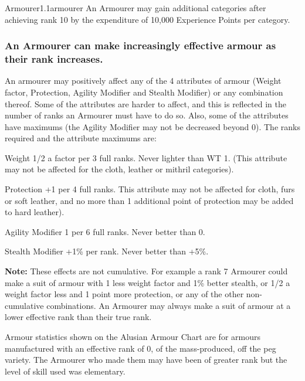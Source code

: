 \begin{skill}{Armourer}{1.1}{armourer}
An Armourer may gain additional categories after achieving rank 10 by
the expenditure of 10,000 Experience Points per category.

\subsubsection{An Armourer can make increasingly effective armour as their
rank increases.}


An armourer may positively affect any of the 4 attributes of armour
(Weight factor, Protection, Agility Modifier and Stealth Modifier) or
any combination thereof.  Some of the attributes are harder to affect,
and this is reflected in the number of ranks an Armourer must have
to do so.  Also, some of the attributes have maximums (\eg the
Agility Modifier may not be decreased beyond 0).  The ranks required
and the attribute maximums are:

\begin{Description}

\item[Weight] 1/2 a factor per 3 full ranks. Never lighter than WT 1.
(This attribute may not be affected for the cloth, leather or mithril
categories).

\item[Protection] +1 per 4 full ranks.  This attribute may not be
affected for cloth, furs or soft leather, and no more than 1 additional
point of protection may be added to hard leather).

\item[Agility Modifier] 1 per 6 full ranks.  Never better than 0.

\item[Stealth Modifier] +1\% per rank.  Never better than +5\%.

\end{Description}

\textbf{Note:} These effects are not cumulative.  For example a rank 7
Armourer could make a suit of armour with 1 less weight factor and 1\%
better stealth, or 1/2 a weight factor less and 1 point more
protection, or any of the other non-cumulative combinations.  An
Armourer may always make a suit of armour at a lower effective rank
than their true rank.

Armour statistics shown on the Alusian Armour Chart are for armours
manufactured with an effective rank of 0, \ie of the mass-produced,
off the peg variety.  The Armourer who made them may have been of
greater rank but the level of skill used was elementary.


\end{skill}
